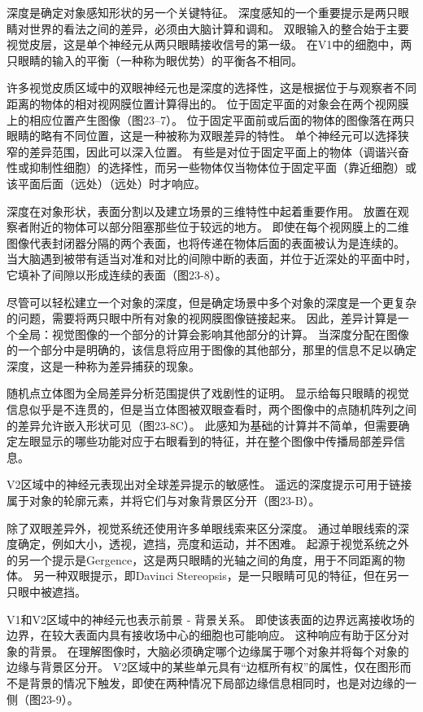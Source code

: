深度是确定对象感知形状的另一个关键特征。
深度感知的一个重要提示是两只眼睛对世界的看法之间的差异，必须由大脑计算和调和。
双眼输入的整合始于主要视觉皮层，这是单个神经元从两只眼睛接收信号的第一级。 
在V1中的细胞中，两只眼睛的输入的平衡（一种称为眼优势）的平衡各不相同。


许多视觉皮质区域中的双眼神经元也是深度的选择性，这是根据位于与观察者不同距离的物体的相对视网膜位置计算得出的。 
位于固定平面的对象会在两个视网膜上的相应位置产生图像（图23–7）。
位于固定平面前或后面的物体的图像落在两只眼睛的略有不同位置，这是一种被称为双眼差异的特性。
单个神经元可以选择狭窄的差异范围，因此可以深入位置。
有些是对位于固定平面上的物体（调谐兴奋性或抑制性细胞）的选择性，而另一些物体仅当物体位于固定平面（靠近细胞）或该平面后面（远处）（远处）时才响应。


深度在对象形状，表面分割以及建立场景的三维特性中起着重要作用。
放置在观察者附近的物体可以部分阻塞那些位于较远的地方。
即使在每个视网膜上的二维图像代表封闭器分隔的两个表面，也将传递在物体后面的表面被认为是连续的。
当大脑遇到被带有适当对准和对比的间隙中断的表面，并位于近深处的平面中时，它填补了间隙以形成连续的表面（图23-8）。


尽管可以轻松建立一个对象的深度，但是确定场景中多个对象的深度是一个更复杂的问题，需要将两只眼中所有对象的视网膜图像链接起来。 
因此，差异计算是一个全局：视觉图像的一个部分的计算会影响其他部分的计算。 
当深度分配在图像的一个部分中是明确的，该信息将应用于图像的其他部分，那里的信息不足以确定深度，这是一种称为差异捕获的现象。


随机点立体图为全局差异分析范围提供了戏剧性的证明。 
显示给每只眼睛的视觉信息似乎是不连贯的，但是当立体图被双眼查看时，两个图像中的点随机阵列之间的差异允许嵌入形状可见（图23-8C）。 
此感知为基础的计算并不简单，但需要确定左眼显示的哪些功能对应于右眼看到的特征，并在整个图像中传播局部差异信息。


V2区域中的神经元表现出对全球差异提示的敏感性。 
遥远的深度提示可用于链接属于对象的轮廓元素，并将它们与对象背景区分开（图23-B）。


除了双眼差异外，视觉系统还使用许多单眼线索来区分深度。 
通过单眼线索的深度确定，例如大小，透视，遮挡，亮度和运动，并不困难。 
起源于视觉系统之外的另一个提示是Gergence，这是两只眼睛的光轴之间的角度，用于不同距离的物体。 
另一种双眼提示，即Davinci Stereopsis，是一只眼睛可见的特征，但在另一只眼中被遮挡。


V1和V2区域中的神经元也表示前景 - 背景关系。 
即使该表面的边界远离接收场的边界，在较大表面内具有接收场中心的细胞也可能响应。 
这种响应有助于区分对象的背景。 
在理解图像时，大脑必须确定哪个边缘属于哪个对象并将每个对象的边缘与背景区分开。 V2区域中的某些单元具有“边框所有权”的属性，仅在图形而不是背景的情况下触发，即使在两种情况下局部边缘信息相同时，也是对边缘的一侧（图23-9）。



